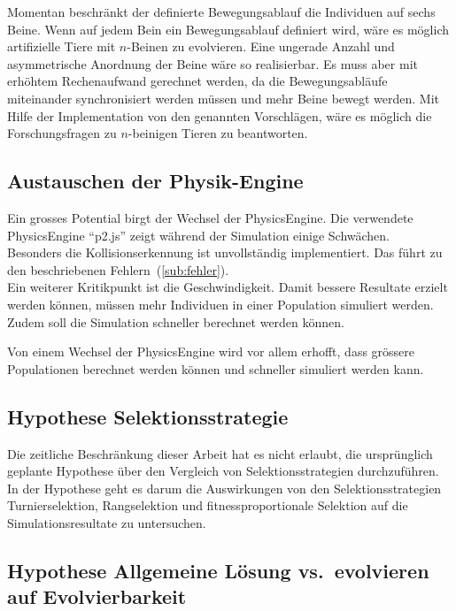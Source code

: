       Momentan beschränkt der definierte Bewegungsablauf die Individuen auf sechs Beine.
      Wenn auf jedem Bein ein Bewegungsablauf definiert wird,
      wäre es möglich artifizielle Tiere mit \(n\)-Beinen zu evolvieren.
      Eine ungerade Anzahl und asymmetrische Anordnung der Beine wäre so realisierbar.
      Es muss aber mit erhöhtem Rechenaufwand gerechnet werden,
      da die Bewegungsabläufe miteinander synchronisiert werden müssen und mehr Beine bewegt werden.
      Mit Hilfe der Implementation von den genannten Vorschlägen, wäre es möglich die Forschungsfragen zu
      \(n\)-beinigen Tieren zu beantworten.

    \subsection{Austauschen der Physik-Engine}

      Ein grosses Potential birgt der Wechsel der \gls{PhysicsEngine}.
      Die verwendete \gls{PhysicsEngine} ``p2.js'' zeigt während der Simulation einige Schwächen.
      \\
      Besonders die Kollisionserkennung ist unvollständig implementiert.
      Das führt zu den beschriebenen Fehlern~(\vref{sub:fehler}).
      \\
      Ein weiterer Kritikpunkt ist die Geschwindigkeit. Damit bessere Resultate erzielt werden können,
      müssen mehr Individuen in einer Population simuliert werden.
      Zudem soll die Simulation schneller berechnet werden können.

      \medskip

      Von einem Wechsel der \gls{PhysicsEngine} wird vor allem erhofft,
      dass grössere Populationen berechnet werden können und schneller simuliert werden kann.

    \subsection{Hypothese Selektionsstrategie\label{sub:hypoSelect}}

      Die zeitliche Beschränkung dieser Arbeit hat es nicht erlaubt,
      die ursprünglich geplante Hypothese über den Vergleich von Selektionsstrategien durchzuführen.
      In der Hypothese geht es darum die Auswirkungen von den Selektionsstrategien Turnierselektion,
      Rangselektion und fitnessproportionale Selektion auf die Simulationsresultate zu untersuchen.

    \subsection{Hypothese Allgemeine Lösung vs.\ evolvieren auf Evolvierbarkeit\label{sub:hypoAnsatz}}

